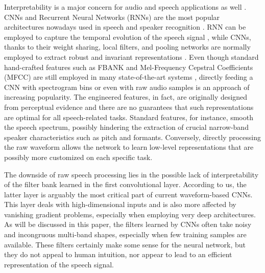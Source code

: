 \documentclass{article}
\begin{document}
Interpretability is a major concern for audio and speech applications as well \cite{int_audio}. CNNs and Recurrent Neural Networks (RNNs) are the most popular architectures nowadays used in speech and speaker recognition \cite{lideng}. RNN can be employed to capture the temporal evolution of the speech signal \cite{lstm,gru2,ravanelli_is17,li_gru}, while CNNs, thanks to their weight sharing, local filters, and pooling  networks are normally employed to extract robust and invariant representations \cite{cnn_lecun}. Even though standard hand-crafted features such as FBANK and Mel-Frequency Cepstral Coefficients (MFCC)  are still employed in many state-of-the-art systems \cite{dnn_spk_rec_class2,dnn_speaker_rec_plp,spk_id_mfcc}, directly feeding a CNN with spectrogram bins \cite{e2e_spk_id,spk_rec_time_freq,voxceleb} or even with raw audio samples \cite{palaz_raw,tara_raw,google_rawmulti,joint7,tuske,dnn_emotion,wavenet,sample_rnn,acoustic_raw_povey,spoofing_raw,raw_speaker_id,verification_raw_ICASSP2018,verification_raw_IS2018} is an approach of increasing popularity.
The engineered features, in fact, are originally designed from perceptual evidence and there are no guarantees that such representations are optimal for all speech-related tasks. Standard features, for instance, smooth the speech spectrum, possibly hindering the extraction of crucial narrow-band speaker characteristics such as pitch and formants. Conversely, directly processing the raw waveform allows the network to learn low-level representations that are possibly more customized on each specific task.

The downside of raw speech processing lies in the possible lack of interpretability of the filter bank learned in the first convolutional layer. According to us, the latter layer is arguably the most critical part of current waveform-based CNNs. This layer deals with high-dimensional inputs and is also more affected by vanishing gradient problems, especially when employing very deep architectures. As will be discussed in this paper, the filters learned by CNNs often take noisy and incongruous multi-band shapes, especially when few training samples are available. These filters certainly make some sense for the neural network, but they do not appeal to human intuition, nor appear to lead to an efficient representation of the speech signal. 
\end{document}

